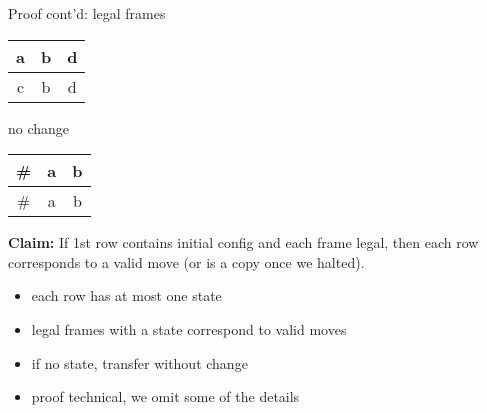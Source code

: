 \documentclass[handout]{beamer}
\begin{document}
\begin{frame}{Proof cont'd: legal frames}
\begin{center}
\begin{minipage}{0.32\textwidth}
            \begin{tabular}{|c|c|c|}\hline
                a & b & d\\\hline
                c & b & d \\\hline
            \end{tabular}
        \end{minipage}
        \begin{minipage}{0.32\textwidth}
            no change
    
            \begin{tabular}{|c|c|c|}\hline
                \# & a & b\\\hline
                \# & a & b\\\hline
            \end{tabular}
        \end{minipage}

    \end{center}

    \smallskip
    
    \textbf{Claim:} If 1st row contains initial config and each frame legal, then each row corresponds to a valid move (or is a copy once we halted).
    
    \vspace{-3pt}
    \begin{itemize}
        \item each row has at most one state
        \item legal frames with a state correspond to valid moves
        \item if no state, transfer without change
        \item proof technical, we omit some of the details
    \end{itemize}

\end{frame}
\end{document}
